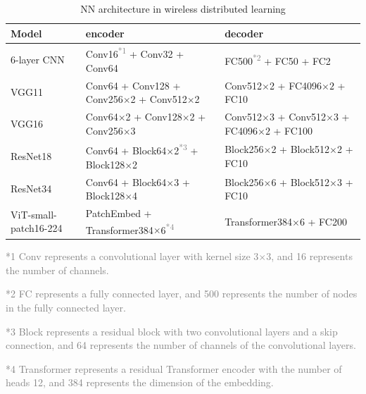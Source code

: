 \documentclass[lettersize,journal]{IEEEtran}
\theoremstyle{definition}
\theoremstyle{plain}
\begin{document}
\renewcommand{\arraystretch}{1.2}
\begin{table}[htbp]
    \small
    \caption{NN architecture in wireless distributed learning}
    \label{tab:architecture}
    \centering
    \begin{center}
        \begin{threeparttable}
            \begin{tabular}{|m{}<{\centering}|m{}<{\centering}|m{}<{\centering}|}%
                \hline
                Model & encoder & decoder \\
                \hline
                6-layer CNN & Conv16\textsuperscript{\textcolor{gray}{*1}} + Conv32 + Conv64 & FC500\textsuperscript{\textcolor{gray}{*2}} + FC50 + FC2 \\ 
                \hline
                VGG11      & Conv64 + Conv128 + Conv256$\times$2 + Conv512$\times$2 & Conv512$\times$2 + FC4096$\times 2$ + FC10 \\ 
                \hline
                VGG16      & Conv64$\times$2 + Conv128$\times$2 + Conv256$\times$3 & Conv512$\times$3 + Conv512$\times$3 + FC4096$\times 2$ + FC100 \\ 
                \hline
                ResNet18      & Conv64 + Block64$\times$2\textsuperscript{\textcolor{gray}{*3}} + Block128$\times$2 & Block256$\times$2 + Block512$\times$2 + FC10 \\ 
                \hline
                ResNet34      & Conv64 + Block64$\times$3 + Block128$\times$4 & Block256$\times$6 + Block512$\times$3 + FC10 \\ 
                \hline
                ViT-small-patch16-224      & PatchEmbed + Transformer384$\times$6\textsuperscript{\textcolor{gray}{*4}} & Transformer384$\times$6 + FC200 \\ 
                \hline
            \end{tabular}
            \begin{tablenotes}
                    \item \textcolor{gray}{*1} \textcolor{gray}{Conv represents a convolutional layer with kernel size 3$\times$3, and 16 represents the number of channels.} 
                    \item \textcolor{gray}{*2} \textcolor{gray}{FC represents a fully connected layer, and 500 represents the number of nodes in the fully connected layer.}
                    \item \textcolor{gray}{*3} \textcolor{gray}{Block represents a residual block with two convolutional layers and a skip connection, and 64 represents the number of channels of the convolutional layers.}
                    \item \textcolor{gray}{*4} \textcolor{gray}{Transformer represents a residual Transformer encoder with the number of heads 12, and 384 represents the dimension of the embedding.}
            \end{tablenotes}
        \end{threeparttable}
    \end{center}
\end{table}
\end{document}
